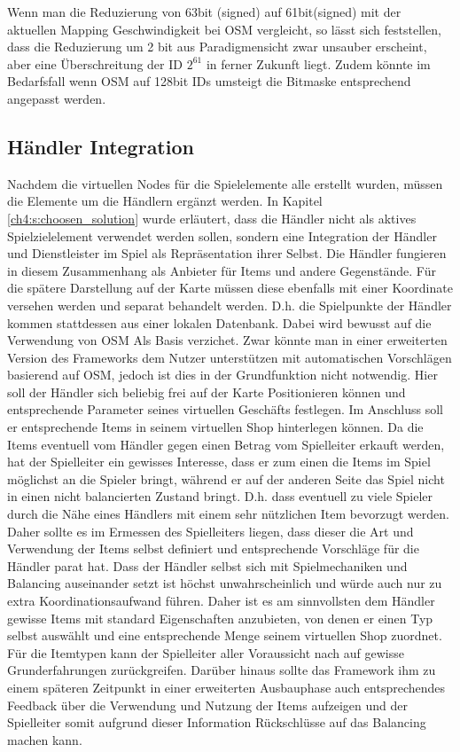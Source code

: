 Wenn man die Reduzierung von 63bit (signed) auf 61bit(signed) mit der aktuellen Mapping Geschwindigkeit bei OSM vergleicht, so lässt sich feststellen, dass die Reduzierung um 2 bit aus Paradigmensicht zwar unsauber erscheint, aber eine Überschreitung der ID \begin{math}2^{61}\end{math} in ferner Zukunft liegt. Zudem könnte im Bedarfsfall wenn OSM auf 128bit IDs umsteigt die Bitmaske entsprechend angepasst werden.

\subsection*{Händler Integration}

Nachdem die virtuellen Nodes für die Spielelemente alle erstellt wurden, müssen die Elemente um die Händlern ergänzt werden. In Kapitel \ref{ch4:s:choosen_solution} wurde erläutert, dass die Händler nicht als aktives Spielzielelement verwendet werden sollen, sondern eine Integration der Händler und Dienstleister im Spiel als Repräsentation ihrer Selbst. Die Händler fungieren in diesem Zusammenhang als Anbieter für Items und andere Gegenstände. Für die spätere Darstellung auf der Karte müssen diese ebenfalls mit einer Koordinate versehen werden und separat behandelt werden. D.h. die Spielpunkte der Händler kommen stattdessen aus einer lokalen Datenbank. Dabei wird bewusst auf die Verwendung von OSM Als Basis verzichet. Zwar könnte man in einer erweiterten Version des Frameworks dem Nutzer unterstützen mit automatischen Vorschlägen basierend auf OSM, jedoch ist dies in der Grundfunktion nicht notwendig. Hier soll der Händler sich beliebig frei auf der Karte Positionieren können und entsprechende Parameter seines virtuellen Geschäfts festlegen. Im Anschluss soll er entsprechende Items in seinem virtuellen Shop hinterlegen können. Da die Items eventuell vom Händler gegen einen Betrag vom Spielleiter erkauft werden, hat der Spielleiter ein gewisses Interesse, dass er zum einen die Items im Spiel möglichst an die Spieler bringt, während er auf der anderen Seite das Spiel nicht in einen nicht balancierten Zustand bringt. D.h. dass eventuell zu viele Spieler durch die Nähe eines Händlers mit einem sehr nützlichen Item bevorzugt werden. Daher sollte es im Ermessen des Spielleiters liegen, dass dieser die Art und Verwendung der Items selbst definiert und entsprechende Vorschläge für die Händler parat hat. Dass der Händler selbst sich mit Spielmechaniken und Balancing auseinander setzt ist höchst unwahrscheinlich und würde auch nur zu extra Koordinationsaufwand führen. Daher ist es am sinnvollsten dem Händler gewisse Items mit standard Eigenschaften anzubieten, von denen er einen Typ selbst auswählt und eine entsprechende Menge seinem virtuellen Shop zuordnet.
Für die Itemtypen kann der Spielleiter aller Voraussicht nach auf gewisse Grunderfahrungen zurückgreifen. Darüber hinaus sollte das Framework ihm zu einem späteren Zeitpunkt in einer erweiterten Ausbauphase auch entsprechendes Feedback über die Verwendung und Nutzung der Items aufzeigen und der Spielleiter somit aufgrund dieser Information Rückschlüsse auf das Balancing machen kann.

